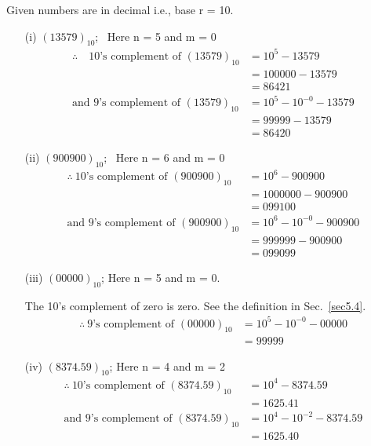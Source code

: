 \eject

\begin{solution}
Given numbers are in decimal i.e., base r = 10.
\begin{itemize}
\item[(i)] $(13579)_{10}$\qquad ;~ Here n = 5 and m = 0
\begin{align*}
\therefore\quad \text{10's complement of } (13579)_{10} &= 10^{5}-13579\\[3pt]
&= 100000-13579\\[3pt]
&= 86421\\[3pt]
\text{and 9's complement of } (13579)_{10} &= 10^{5}-10^{-0}-13579\\[3pt]
&= 99999-13579\\[3pt]
&= 86420
\end{align*}

\item[(ii)] $(900900)_{10}$\qquad ;~ Here n = 6 and m = 0
\begin{align*}
\therefore~ \text{10's complement of } (900900)_{10} &= 10^{6}-900900\\[3pt]
&= 1000000 - 900900\\[3pt]
&= 099100\\[3pt]
\text{and 9's complement of } (900900)_{10} &= 10^{6}-10^{-0}-900900\\[3pt]
 &= 999999-900900\\[3pt]
 &= 099099
\end{align*}

\item[(iii)] $(00000)_{10}$\qquad ; Here n = 5 and m = 0.

The 10's complement of zero is zero. See the definition in Sec.~\ref{sec5.4}.
\begin{align*}
\therefore~ \text{9's complement of } (00000)_{10} &= 10^{5}-10^{-0}-00000\\[3pt]
                                                  &= 99999
\end{align*}

\item[(iv)] $(8374.59)_{10}$\qquad ; Here n = 4 and m = 2
\begin{align*}
\therefore~ \text{10's complement of } (8374.59)_{10} &= 10^{4}-8374.59\\[3pt]
&= 1625.41\\[3pt]
\text{and 9's complement of } (8374.59)_{10} &= 10^{4}-10^{-2}-8374.59\\[3pt]
&= 1625.40
\end{align*}


\end{itemize}
\end{solution}
